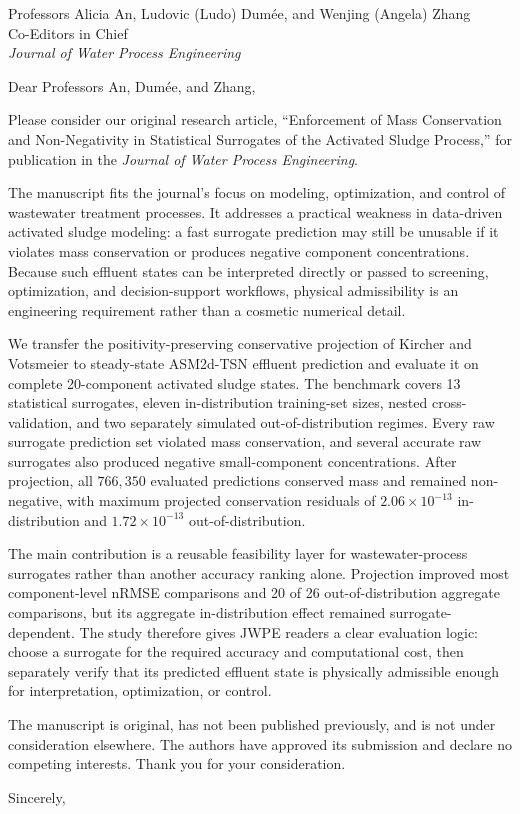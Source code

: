 \documentclass[11pt]{letter}
\date{\today}
\begin{document}
\begin{letter}{Professors Alicia An, Ludovic (Ludo) Dum\'ee, and Wenjing (Angela) Zhang\\
Co-Editors in Chief\\
\textit{Journal of Water Process Engineering}}

\opening{Dear Professors An, Dum\'ee, and Zhang,}

Please consider our original research article, ``Enforcement of Mass Conservation and Non-Negativity in Statistical Surrogates of the Activated Sludge Process,'' for publication in the \textit{Journal of Water Process Engineering}.

The manuscript fits the journal's focus on modeling, optimization, and control of wastewater treatment processes. It addresses a practical weakness in data-driven activated sludge modeling: a fast surrogate prediction may still be unusable if it violates mass conservation or produces negative component concentrations. Because such effluent states can be interpreted directly or passed to screening, optimization, and decision-support workflows, physical admissibility is an engineering requirement rather than a cosmetic numerical detail.

We transfer the positivity-preserving conservative projection of Kircher and Votsmeier to steady-state ASM2d-TSN effluent prediction and evaluate it on complete 20-component activated sludge states. The benchmark covers 13 statistical surrogates, eleven in-distribution training-set sizes, nested cross-validation, and two separately simulated out-of-distribution regimes. Every raw surrogate prediction set violated mass conservation, and several accurate raw surrogates also produced negative small-component concentrations. After projection, all $766{,}350$ evaluated predictions conserved mass and remained non-negative, with maximum projected conservation residuals of $2.06\times10^{-13}$ in-distribution and $1.72\times10^{-13}$ out-of-distribution.

The main contribution is a reusable feasibility layer for wastewater-process surrogates rather than another accuracy ranking alone. Projection improved most component-level nRMSE comparisons and 20 of 26 out-of-distribution aggregate comparisons, but its aggregate in-distribution effect remained surrogate-dependent. The study therefore gives JWPE readers a clear evaluation logic: choose a surrogate for the required accuracy and computational cost, then separately verify that its predicted effluent state is physically admissible enough for interpretation, optimization, or control.

The manuscript is original, has not been published previously, and is not under consideration elsewhere. The authors have approved its submission and declare no competing interests. Thank you for your consideration.

\closing{Sincerely,}

\end{letter}
\end{document}
